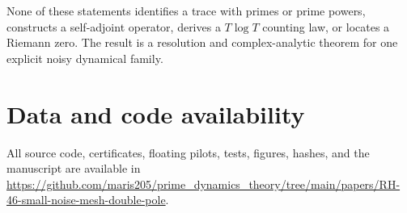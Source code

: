 \documentclass[11pt]{article}
\theoremstyle{definition}
\theoremstyle{remark}
\begin{document}
None of these statements identifies a trace with primes or prime powers,
constructs a self-adjoint operator, derives a $T\log T$ counting law, or
locates a Riemann zero.  The result is a resolution and complex-analytic
theorem for one explicit noisy dynamical family.

\section*{Data and code availability}

All source code, certificates, floating pilots, tests, figures, hashes, and
the manuscript are available in
\url{https://github.com/maris205/prime_dynamics_theory/tree/main/papers/RH-46-small-noise-mesh-double-pole}.



\end{document}

